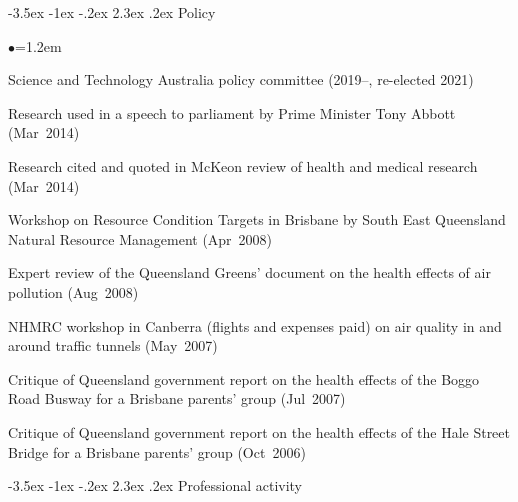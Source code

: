 \documentclass[a4paper,11pt]{article}
\makeatletter
\renewcommand\section{\@startsection {section}{1}{\z@}%
                                   {-3.5ex \@plus -1ex \@minus -.2ex}%
                                   {2.3ex \@plus.2ex}%
                                   {\normalfont\large\bfseries\color{blue}}}
\renewcommand{\labelitemi}{$\bullet$}
\makeatother
\begin{document}
\begin{raggedright}
\section{Policy}

\begin{list}{\labelitemi}{\leftmargin=1.2em}\addtolength{\itemsep}{-0.4\baselineskip}
\item Science and Technology Australia policy committee (2019--, re-elected 2021)
\item Research used in a speech to parliament by Prime Minister Tony Abbott (Mar~2014)
\item Research cited and quoted in McKeon review of health and medical research (Mar~2014)
\item Workshop on Resource Condition Targets in Brisbane by South East Queensland Natural Resource Management (Apr~2008)
\item Expert review of the Queensland Greens' document on the health effects of air pollution (Aug~2008)
\item NHMRC workshop in Canberra (flights and expenses paid) on air quality in and around traffic tunnels (May~2007)
\item Critique of Queensland government report on the health effects of the Boggo Road Busway for a Brisbane parents' group (Jul~2007)
\item Critique of Queensland government report on the health effects of the Hale Street Bridge for a Brisbane parents' group (Oct~2006)
\end{list}

\section{Professional activity}


\end{raggedright}
\end{document}
